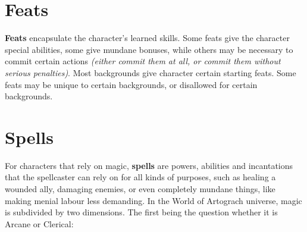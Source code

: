 \documentclass[tikz,openany,11pt,a4paper]{book}
\begin{document}
\section{Feats}
\textbf{Feats} encapsulate the character's learned skills. Some feats give the character special abilities, some give mundane bonuses, while others may be necessary to commit certain actions \textit{(either commit them at all, or commit them without serious penalties)}. Most backgrounds give character certain starting feats. Some feats may be unique to certain backgrounds, or disallowed for certain backgrounds.
\section{Spells}
For characters that rely on magic, \textbf{spells} are powers, abilities and incantations that the spellcaster can rely on for all kinds of purposes, such as healing a wounded ally, damaging enemies, or even completely mundane things, like making menial labour less demanding. In the World of Artograch universe, magic is subdivided by two dimensions. The first being the question whether it is Arcane or Clerical:
\end{document}
